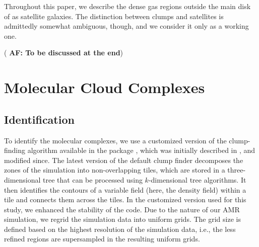 \IfFileExists{emulateapjlegacy.cls}{\documentclass[iop]{emulateapjlegacy}}{\documentclass[iop]{emulateapj}}
\newcommand{\AF}[1]{({\bf \color{afcolor} AF: #1})}
\begin{document}
Throughout this paper, we 
     describe  the dense gas regions outside the main disk of \flower
     as satellite galaxies.
The distinction between clumps and satellites is admittedly somewhat
ambiguous, though, and we consider it only as a working one.

\AF{To be discussed at the end}

\section{Molecular Cloud Complexes}\label{sec:eqn}

\subsection{Identification}\label{sec:method}

To identify the molecular complexes, we use a customized version of
the clump-finding algorithm available in the  package
 \citep{Turk11a}, which was initially described in
\citet{Smith09a}, 
     and modified since.
The latest version of the default  clump finder decomposes
the zones of the simulation into non-overlapping tiles, which are
stored in a 
     three-dimensional tree that can be processed using $k$-dimensional tree algorithms.
It then identifies the contours of a variable field (here, the density
field) within a tile and connects them across the tiles. In the
customized version used for this study, we
     enhanced
the stability of the code.
%
Due to the nature of our AMR simulation, we regrid the simulation data into uniform grids. The grid size is defined based on the highest resolution of the simulation data, i.e., the less refined regions are supersampled in the resulting uniform grids.
\end{document}

